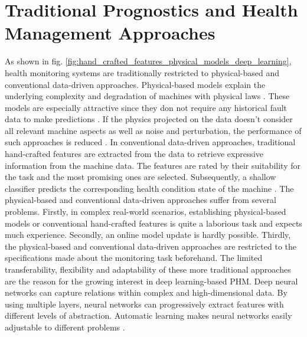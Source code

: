 \section{Traditional Prognostics and Health Management Approaches}
As shown in fig. \ref{fig:hand_crafted_features_physical_models_deep_learning}, health monitoring systems are traditionally restricted to physical-based and conventional data-driven approaches. Physical-based models explain the underlying complexity and degradation of machines with physical laws \cite{ZHAO2019213}. These models are especially attractive since they don not require any historical fault data to make predictions \cite{Benker2019}. If the physics projected on the data doesn't consider all relevant machine aspects as well as noise and perturbation, the performance of such approaches is reduced \cite{ZHAO2019213}. In conventional data-driven approaches, traditional hand-crafted features are extracted from the data to retrieve expressive information from the machine data. The features are rated by their suitability for the task and the most promising ones are selected. Subsequently, a shallow classifier predicts the corresponding health condition state of the machine \cite{ZHAO2019213}. The physical-based and conventional data-driven approaches suffer from several problems. Firstly, in complex real-world scenarios, establishing physical-based models or conventional hand-crafted features is quite a laborious task and expects much experience. Secondly, an online model update is hardly possible. Thirdly, the physical-based and conventional data-driven approaches are restricted to the specifications made about the monitoring task beforehand. The limited transferability, flexibility and adaptability of these more traditional approaches are the reason for the growing interest in deep learning-based PHM. Deep neural networks can capture relations within complex and high-dimensional data. By using multiple layers, neural networks can progressively extract features with different levels of abstraction. Automatic learning makes neural networks easily adjustable to different problems \cite{ZHAO2019213}.
